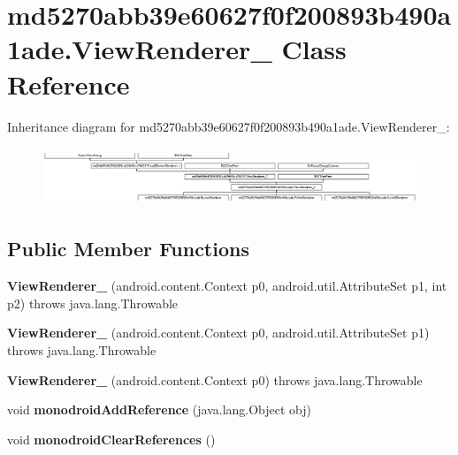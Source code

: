 \hypertarget{classmd5270abb39e60627f0f200893b490a1ade_1_1ViewRenderer__2}{}\section{md5270abb39e60627f0f200893b490a1ade.\+View\+Renderer\+\_ Class Reference}
\label{classmd5270abb39e60627f0f200893b490a1ade_1_1ViewRenderer__2}
Inheritance diagram for md5270abb39e60627f0f200893b490a1ade.\+View\+Renderer\+\_\+:\begin{figure}[H]
\begin{center}
\leavevmode
\includegraphics[height=1.754386cm]{classmd5270abb39e60627f0f200893b490a1ade_1_1ViewRenderer__2}
\end{center}
\end{figure}
\subsection*{Public Member Functions}
\begin{DoxyCompactItemize}
\item 
\mbox{\label{classmd5270abb39e60627f0f200893b490a1ade_1_1ViewRenderer__2_a34f641fdb772410dc88ca2ac5c3fb492}} 
{\bfseries View\+Renderer\+\_} (android.\+content.\+Context p0, android.\+util.\+Attribute\+Set p1, int p2)  throws java.\+lang.\+Throwable 	
\item 
\mbox{\label{classmd5270abb39e60627f0f200893b490a1ade_1_1ViewRenderer__2_a0295102267caddfc524759e82d0f5b04}} 
{\bfseries View\+Renderer\+\_} (android.\+content.\+Context p0, android.\+util.\+Attribute\+Set p1)  throws java.\+lang.\+Throwable 	
\item 
\mbox{\label{classmd5270abb39e60627f0f200893b490a1ade_1_1ViewRenderer__2_a7f4b9d7dd89bbae2b8dd2f6c799e4c02}} 
{\bfseries View\+Renderer\+\_} (android.\+content.\+Context p0)  throws java.\+lang.\+Throwable 	
\item 
\mbox{\label{classmd5270abb39e60627f0f200893b490a1ade_1_1ViewRenderer__2_a04a86dd6eb699648d23fe42d567c6962}} 
void {\bfseries monodroid\+Add\+Reference} (java.\+lang.\+Object obj)
\item 
\mbox{\label{classmd5270abb39e60627f0f200893b490a1ade_1_1ViewRenderer__2_a4832372c2c5755cd4e9f279f9b051454}} 
void {\bfseries monodroid\+Clear\+References} ()
\end{DoxyCompactItemize}

